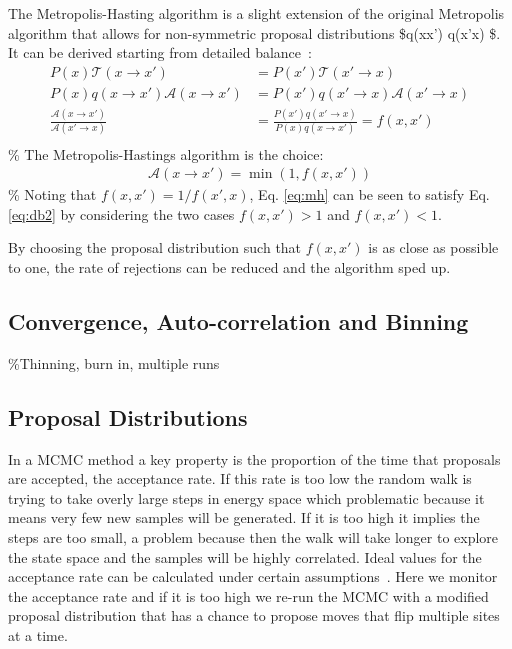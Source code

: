 The Metropolis-Hasting algorithm is a slight extension of the original Metropolis algorithm that allows for non-symmetric proposal distributions \$q(x\to x') \neq q(x'\to x) \$. It can be derived starting from detailed balance~\autocite{krauthIntroductionMonteCarlo1998}: \[\begin{aligned}
P(x)\mathcal{T}(x \to x') &= P(x')\mathcal{T}(x' \to x) \\
P(x)q(x \to x')\mathcal{A}(x \to x') &= P(x')q(x' \to x)\mathcal{A}(x' \to x) \\
\label{eq:db2} \frac{\mathcal{A}(x \to x')}{\mathcal{A}(x' \to x)} &= \frac{P(x')q(x' \to x)}{P(x)q(x \to x')} = f(x, x')\\
\end{aligned}
\] \% The Metropolis-Hastings algorithm is the choice: \[
\begin{aligned}
\label{eq:mh} 
\mathcal{A}(x \to x') = \min\left(1, f(x,x')\right)
\end{aligned}
\] \% Noting that \(f(x,x') = 1/f(x',x)\), Eq. \ref{eq:mh} can be seen to satisfy Eq. \ref{eq:db2} by considering the two cases \(f(x,x') > 1\) and \(f(x,x') < 1\).

By choosing the proposal distribution such that \(f(x,x')\) is as close as possible to one, the rate of rejections can be reduced and the algorithm sped up.

\hypertarget{convergence-auto-correlation-and-binning}{%
\subsection{Convergence, Auto-correlation and Binning}\label{convergence-auto-correlation-and-binning}}

\%Thinning, burn in, multiple runs

\hypertarget{proposal-distributions}{%
\subsection{Proposal Distributions}\label{proposal-distributions}}

In a MCMC method a key property is the proportion of the time that proposals are accepted, the acceptance rate. If this rate is too low the random walk is trying to take overly large steps in energy space which problematic because it means very few new samples will be generated. If it is too high it implies the steps are too small, a problem because then the walk will take longer to explore the state space and the samples will be highly correlated. Ideal values for the acceptance rate can be calculated under certain assumptions~\autocite{robertsWeakConvergenceOptimal1997}. Here we monitor the acceptance rate and if it is too high we re-run the MCMC with a modified proposal distribution that has a chance to propose moves that flip multiple sites at a time.

